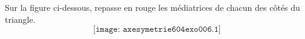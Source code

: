 Sur la figure ci-dessous, repasse en rouge les médiatrices de chacun des côtés du triangle.
\[\texttt{[image: axesymetrie604exo006.1]}\]